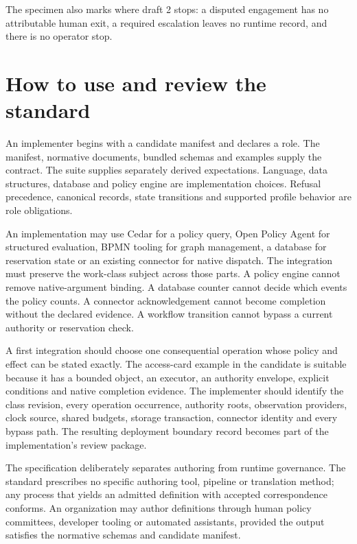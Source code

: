 \documentclass[
  american,
  11pt,
  letterpaper,
]{article}
\begin{document}
The specimen also marks where draft 2 stops: a disputed engagement has
no attributable human exit, a required escalation leaves no runtime
record, and there is no operator stop.

\section{How to use and review the
standard}\label{how-to-use-and-review-the-standard}

An implementer begins with a candidate manifest and declares a role. The
manifest, normative documents, bundled schemas and examples supply the
contract. The suite supplies separately derived expectations. Language,
data structures, database and policy engine are implementation choices.
Refusal precedence, canonical records, state transitions and supported
profile behavior are role obligations.

An implementation may use Cedar for a policy query, Open Policy Agent
for structured evaluation, BPMN tooling for graph management, a database
for reservation state or an existing connector for native dispatch. The
integration must preserve the work-class subject across those parts. A
policy engine cannot remove native-argument binding. A database counter
cannot decide which events the policy counts. A connector
acknowledgement cannot become completion without the declared evidence.
A workflow transition cannot bypass a current authority or reservation
check.

A first integration should choose one consequential operation whose
policy and effect can be stated exactly. The access-card example in the
candidate is suitable because it has a bounded object, an executor, an
authority envelope, explicit conditions and native completion evidence.
The implementer should identify the class revision, every operation
occurrence, authority roots, observation providers, clock source, shared
budgets, storage transaction, connector identity and every bypass path.
The resulting deployment boundary record becomes part of the
implementation's review package.

The specification deliberately separates authoring from runtime
governance. The standard prescribes no specific authoring tool, pipeline
or translation method; any process that yields an admitted definition
with accepted correspondence conforms. An organization may author
definitions through human policy committees, developer tooling or
automated assistants, provided the output satisfies the normative
schemas and candidate manifest.
\end{document}
